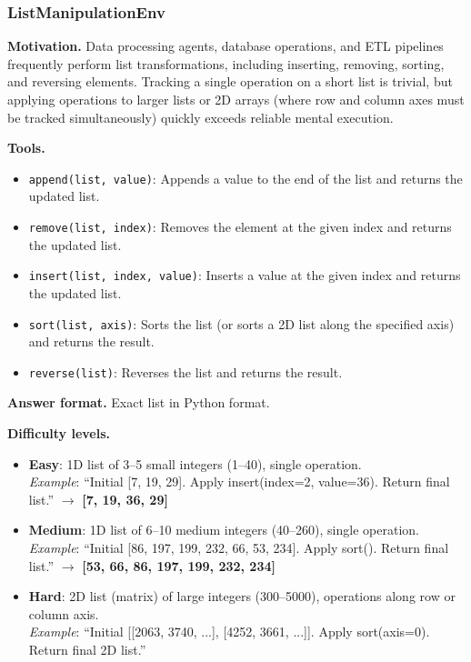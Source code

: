 \subsubsection{ListManipulationEnv}

\textbf{Motivation.}
Data processing agents, database operations, and ETL pipelines frequently perform list transformations, including inserting, removing, sorting, and reversing elements. Tracking a single operation on a short list is trivial, but applying operations to larger lists or 2D arrays (where row and column axes must be tracked simultaneously) quickly exceeds reliable mental execution.

\textbf{Tools.}
\begin{itemize}
    \item \texttt{append(list, value)}: Appends a value to the end of the list and returns the updated list.
    \item \texttt{remove(list, index)}: Removes the element at the given index and returns the updated list.
    \item \texttt{insert(list, index, value)}: Inserts a value at the given index and returns the updated list.
    \item \texttt{sort(list, axis)}: Sorts the list (or sorts a 2D list along the specified axis) and returns the result.
    \item \texttt{reverse(list)}: Reverses the list and returns the result.
\end{itemize}

\textbf{Answer format.} Exact list in Python format.

\textbf{Difficulty levels.}
\begin{itemize}
    \item \textbf{Easy}: 1D list of 3--5 small integers (1--40), single operation.\\
    \emph{Example}: ``Initial [7, 19, 29]. Apply insert(index=2, value=36). Return final list.'' $\to$ \textbf{[7, 19, 36, 29]}
    \item \textbf{Medium}: 1D list of 6--10 medium integers (40--260), single operation.\\
    \emph{Example}: ``Initial [86, 197, 199, 232, 66, 53, 234]. Apply sort(). Return final list.'' $\to$ \textbf{[53, 66, 86, 197, 199, 232, 234]}
    \item \textbf{Hard}: 2D list (matrix) of large integers (300--5000), operations along row or column axis.\\
    \emph{Example}: ``Initial [[2063, 3740, ...], [4252, 3661, ...]]. Apply sort(axis=0). Return final 2D list.''
\end{itemize}

